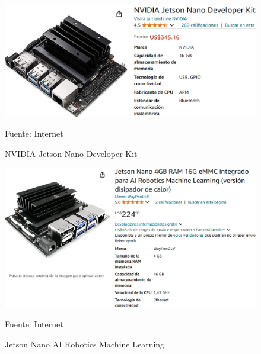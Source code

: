 \begin{figure}[H]
  \centering
  \includegraphics[scale = 0.5]{Imagenes/jetson_nano_amazon.png}
  \caption{NVIDIA Jetson Nano Developer Kit}{Fuente: Internet}
\end{figure}

\begin{figure}[H]
  \centering
  \includegraphics[scale = 0.4]{Imagenes/nano_ai_amazon.png}
  \caption{Jetson Nano AI Robotics Machine Learning}{Fuente: Internet}
\end{figure}